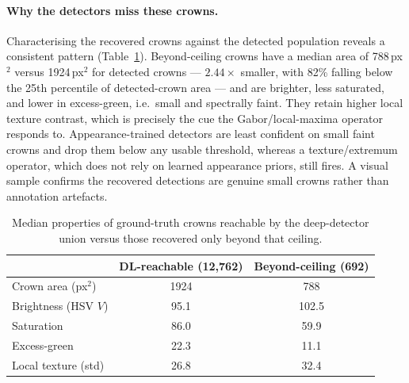 \paragraph{Why the detectors miss these crowns.}
Characterising the recovered crowns against the detected population reveals a
consistent pattern (Table~\ref{tab:beyond}). Beyond-ceiling crowns have a median
area of 788\,px$^2$ versus 1924\,px$^2$ for detected crowns --- $2.44\times$
smaller, with 82\% falling below the 25th percentile of detected-crown area ---
and are brighter, less saturated, and lower in excess-green, i.e.\ small and
spectrally faint. They retain higher local texture contrast, which is precisely
the cue the Gabor/local-maxima operator responds to. Appearance-trained
detectors are least confident on small faint crowns and drop them below any
usable threshold, whereas a texture/extremum operator, which does not rely on
learned appearance priors, still fires. A visual sample confirms the recovered
detections are genuine small crowns rather than annotation artefacts.

\begin{table}[htbp]
\centering
\caption{Median properties of ground-truth crowns reachable by the deep-detector
union versus those recovered only beyond that ceiling.}
\label{tab:beyond}
\begin{tabular}{lcc}
\toprule
 & DL-reachable (12{,}762) & Beyond-ceiling (692) \\
\midrule
Crown area (px$^2$)     & 1924 & 788 \\
Brightness (HSV $V$)    & 95.1 & 102.5 \\
Saturation              & 86.0 & 59.9 \\
Excess-green            & 22.3 & 11.1 \\
Local texture (std)     & 26.8 & 32.4 \\
\bottomrule
\end{tabular}
\end{table}

